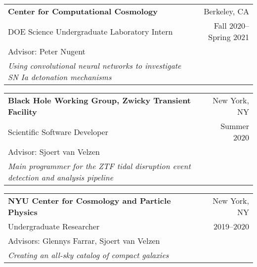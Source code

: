 \documentclass[letterpaper,10pt]{article}
\makeatletter
\newcommand{\resitem}[1]{\item #1 \vspace{-6pt}}
\newcommand{\ressubheading}[5]{
    \vspace{10pt}
    \begin{tabular*}{7.0in}{l@{\extracolsep{\fill}}r}
        \textbf{#1} & #2 \\
        #3 & #4 \\
        #5 & \\
    \end{tabular*}\vspace{-5pt}
}
\makeatother
\begin{document}
    
    \ressubheading{Center for Computational Cosmology}{Berkeley, CA}{DOE Science Undergraduate Laboratory Intern}{Fall 2020--Spring 2021}{Advisor: Peter Nugent \\
    \textit{Using convolutional neural networks to investigate SN Ia detonation mechanisms}}
    
    
    \ressubheading{Black Hole Working Group, Zwicky Transient Facility}{New York, NY}{Scientific Software Developer}{Summer 2020}{Advisor: Sjoert van Velzen \\
    \textit{Main programmer for the ZTF tidal disruption event detection and analysis pipeline}}
    
    
    \ressubheading{NYU Center for Cosmology and Particle Physics}{New York, NY}{Undergraduate Researcher}{2019--2020}{Advisors: Glennys Farrar, Sjoert van Velzen \\
    \textit{Creating an all-sky catalog of compact galaxies}}
    
\end{document}
